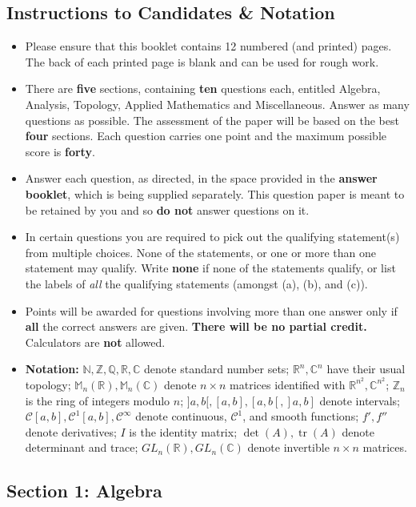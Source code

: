 \documentclass[11pt,a4paper]{article}
\newcommand{\N}{\mathbb{N}}
\newcommand{\Z}{\mathbb{Z}}
\newcommand{\Q}{\mathbb{Q}}
\newcommand{\R}{\mathbb{R}}
\newcommand{\C}{\mathbb{C}}
\newcommand{\M}{\mathbb{M}}
\newcommand{\tr}{\operatorname{tr}}
\newcommand{\examsec}[1]{%
  \subsection*{#1}
  \vspace{-2pt}
}
\begin{document}
\subsection*{Instructions to Candidates \& Notation}
\begin{itemize}
  \item Please ensure that this booklet contains 12 numbered (and printed) pages. The back of each printed page is blank and can be used for rough work.
  \item There are \textbf{five} sections, containing \textbf{ten} questions each, entitled Algebra, Analysis, Topology, Applied Mathematics and Miscellaneous. Answer as many questions as possible. The assessment of the paper will be based on the best \textbf{four} sections. Each question carries one point and the maximum possible score is \textbf{forty}.
  \item Answer each question, as directed, in the space provided in the \textbf{answer booklet}, which is being supplied separately. This question paper is meant to be retained by you and so \textbf{do not} answer questions on it.
  \item In certain questions you are required to pick out the qualifying statement(s) from multiple choices. None of the statements, or one or more than one statement may qualify. Write \textbf{none} if none of the statements qualify, or list the labels of \emph{all} the qualifying statements (amongst (a), (b), and (c)).
  \item Points will be awarded for questions involving more than one answer only if \textbf{all} the correct answers are given. \textbf{There will be no partial credit.} Calculators are \textbf{not} allowed.
  \item \textbf{Notation:} $\N, \Z, \Q, \R, \C$ denote standard number sets; $\R^n, \C^n$ have their usual topology; $\M_n(\R), \M_n(\C)$ denote $n \times n$ matrices identified with $\R^{n^2}, \C^{n^2}$; $\Z_n$ is the ring of integers modulo $n$; $]a, b[, [a, b], [a, b[, ]a, b]$ denote intervals; $\mathcal{C}[a, b], \mathcal{C}^1[a, b], \mathcal{C}^\infty$ denote continuous, $\mathcal{C}^1$, and smooth functions; $f', f''$ denote derivatives; $I$ is the identity matrix; $\det(A), \tr(A)$ denote determinant and trace; $GL_n(\R), GL_n(\C)$ denote invertible $n \times n$ matrices.
\end{itemize}

\examsec{Section 1: Algebra}
\end{document}
